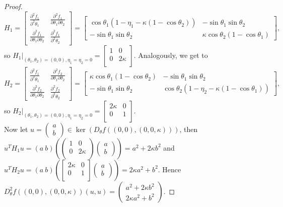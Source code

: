\documentclass[10pt,a4paper]{amsart}
\begin{document}
\begin{proof}
 $$
 H_1 = \begin{bmatrix}
\frac{\partial^2 f_1}{\partial^2 \theta_1} & \frac{\partial^2 f_1}{\partial \theta_1 \partial \theta_2}
\\ \frac{\partial^2 f_1}{\partial \theta_1 \partial \theta_2} & \frac{\partial^2 f_1}{\partial^2 \theta_2} 
 \end{bmatrix}
 =
\begin{bmatrix}
\cos\theta_1(1-\eta_1-\kappa(1-\cos\theta_2)) &  -\sin\theta_1\sin\theta_2 \\
 -\sin\theta_1\sin\theta_2 &\kappa\cos\theta_2(1-\cos\theta_1) 
 \end{bmatrix},$$ so $H_1|_{(\theta_1,\theta_2)=(0,0),\eta_1=\eta_2=0}=
 \begin{bmatrix}
     1 & 0 \\ 0 & 2\kappa \\
 \end{bmatrix}.$
 Analogously, we get to
 $$
 H_2 = \begin{bmatrix}
\frac{\partial^2 f_1}{\partial^2 \theta_1} & \frac{\partial^2 f_2}{\partial \theta_1 \partial \theta_2}
\\ \frac{\partial^2 f_2}{\partial \theta_1 \partial \theta_2} & \frac{\partial^2 f_2}{\partial^2 \theta_2} 
 \end{bmatrix}
 =
\begin{bmatrix}
\kappa\cos\theta_1(1-\cos\theta_2) &  -\sin\theta_1\sin\theta_2 \\
 -\sin\theta_1\sin\theta_2 &\cos\theta_2(1-\eta_2-\kappa(1-\cos\theta_1)) 
 \end{bmatrix},$$ so $H_2|_{(\theta_1,\theta_2)=(0,0),\eta_1=\eta_2=0} =
 \begin{bmatrix}
     2\kappa & 0 \\ 0 & 1 \\
 \end{bmatrix}.$ 
\\ Now let $u = \begin{pmatrix}a\\b \end{pmatrix}\in \ker(D_{\theta} f((0,0),(0,0,\kappa)))$, then $u^TH_1u=(a\ b)\left(\begin{pmatrix}
     1 & 0 \\ 0 & 2\kappa \\
 \end{pmatrix}\begin{pmatrix}
     a\\b
 \end{pmatrix}\right)=a^2+2\kappa b^2$ and
 $u^TH_2u=(a\ b)\left(\begin{bmatrix}
     2\kappa & 0 \\ 0 & 1 \\
 \end{bmatrix}\begin{pmatrix}
     a\\b
 \end{pmatrix}\right)=2\kappa a^2+b^2$. Hence $D_\theta^2f((0,0),(0,0,\kappa))(u,u)=\begin{pmatrix}
     a^2+2\kappa b^2\\2\kappa a^2+b^2
 \end{pmatrix}.$
 


\end{proof}
\end{document}
